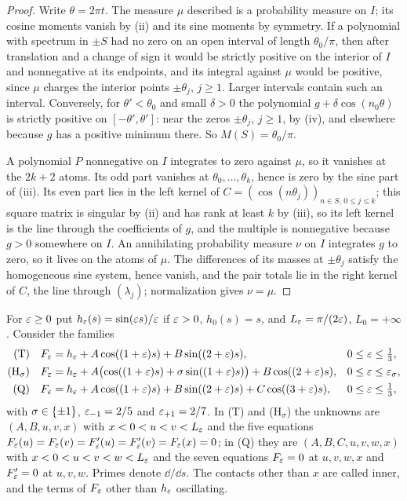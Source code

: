 \begin{proof}
Write $\theta=2\pi t$. The measure $\mu$ described is a probability measure on $I$; its cosine moments vanish by
(ii) and its sine moments by symmetry. If a polynomial with spectrum in $\pm S$ had no zero on an open interval of
length $\theta_0/\pi$, then after translation and a change of sign it would be strictly positive on the interior of
$I$ and nonnegative at its endpoints, and its integral against $\mu$ would be positive, since $\mu$ charges the
interior points $\pm\theta_j$, $j\ge1$. Larger intervals contain such an interval. Conversely, for $\theta'<\theta_0$ and
small $\delta>0$ the polynomial $g+\delta\cos(n_0\theta)$ is strictly positive on $[-\theta',\theta']$: near the zeros
$\pm\theta_j$, $j\ge1$, by (iv), and elsewhere because $g$ has a positive minimum there. So $M(S)=\theta_0/\pi$.

A polynomial $P$ nonnegative on $I$ integrates to zero against $\mu$, so it vanishes at the $2k+2$ atoms. Its odd
part vanishes at $\theta_0,\dots,\theta_k$, hence is zero by the sine part of (iii). Its even part lies in the left kernel
of $C=(\cos(n\theta_j))_{n\in S,\,0\le j\le k}$; this square matrix is singular by (ii) and has rank at least $k$ by (iii),
so its left kernel is the line through the coefficients of $g$, and the multiple is nonnegative because $g>0$
somewhere on $I$. An annihilating probability measure $\nu$ on $I$ integrates $g$ to zero, so it lives on the atoms of
$\mu$. The differences of its masses at $\pm\theta_j$ satisfy the homogeneous sine system, hence vanish, and the pair
totals lie in the right kernel of $C$, the line through $(\lambda_j)$; normalization gives $\nu=\mu$.
\end{proof}

For $\varepsilon\ge0$ put $h_\varepsilon(s)=\sin(\varepsilon s)/\varepsilon$ if $\varepsilon>0$, $h_0(s)=s$, and $L_\varepsilon=\pi/(2\varepsilon)$, $L_0=+\infty$. Consider
the families
\begin{align*}
 \textup{(T)}\quad &F_\varepsilon=h_\varepsilon+A\cos((1+\varepsilon)s)+B\sin((2+\varepsilon)s), && 0\le\varepsilon\le\tfrac13,\\
 \textup{(H$_\sigma$)}\quad &F_\varepsilon=h_\varepsilon+A\bigl(\cos((1+\varepsilon)s)+\sigma\sin((1+\varepsilon)s)\bigr)+B\cos((2+\varepsilon)s), && 0\le\varepsilon\le\varepsilon_\sigma,\\
 \textup{(Q)}\quad &F_\varepsilon=h_\varepsilon+A\cos((1+\varepsilon)s)+B\sin((2+\varepsilon)s)+C\cos((3+\varepsilon)s), && 0\le\varepsilon\le\tfrac13,
\end{align*}
with $\sigma\in\{\pm1\}$, $\varepsilon_{-1}=2/5$ and $\varepsilon_{+1}=2/7$. In (T) and (H$_\sigma$) the unknowns are $(A,B,u,v,x)$ with
$x<0<u<v<L_\varepsilon$ and the five equations $F_\varepsilon(u)=F_\varepsilon(v)=F_\varepsilon'(u)=F_\varepsilon'(v)=F_\varepsilon(x)=0$; in (Q) they are
$(A,B,C,u,v,w,x)$ with $x<0<u<v<w<L_\varepsilon$ and the seven equations $F_\varepsilon=0$ at $u,v,w,x$ and $F_\varepsilon'=0$ at $u,v,w$. Primes
denote $\dd/\dd s$. The contacts other than $x$ are called inner, and the terms of $F_\varepsilon$ other than $h_\varepsilon$ oscillating.

